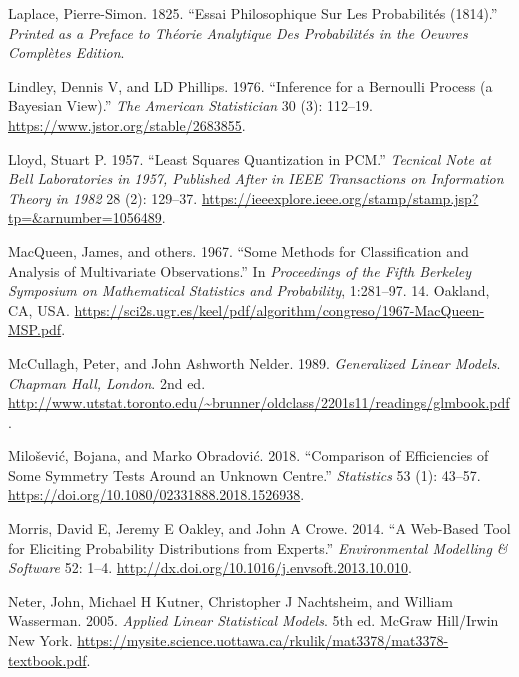 \documentclass[
]{book}
\newlength{\cslhangindent}
\newenvironment{cslreferences}%
  {\setlength{\parindent}{0pt}%
  \everypar{\setlength{\hangindent}{\cslhangindent}}\ignorespaces}%
  {\par}
\theoremstyle{definition}
\theoremstyle{definition}
\theoremstyle{definition}
\theoremstyle{remark}
\begin{document}
\begin{cslreferences}
\leavevmode\hypertarget{ref-laplace1825essai}{}%
Laplace, Pierre-Simon. 1825. ``Essai Philosophique Sur Les Probabilités (1814).'' \emph{Printed as a Preface to Théorie Analytique Des Probabilités in the Oeuvres Complètes Edition}.

\leavevmode\hypertarget{ref-lindley1976inference}{}%
Lindley, Dennis V, and LD Phillips. 1976. ``Inference for a Bernoulli Process (a Bayesian View).'' \emph{The American Statistician} 30 (3): 112--19. \url{https://www.jstor.org/stable/2683855}.

\leavevmode\hypertarget{ref-lloyd1982least}{}%
Lloyd, Stuart P. 1957. ``Least Squares Quantization in PCM.'' \emph{Tecnical Note at Bell Laboratories in 1957, Published After in IEEE Transactions on Information Theory in 1982} 28 (2): 129--37. \url{https://ieeexplore.ieee.org/stamp/stamp.jsp?tp=\&arnumber=1056489}.

\leavevmode\hypertarget{ref-macqueen1967some}{}%
MacQueen, James, and others. 1967. ``Some Methods for Classification and Analysis of Multivariate Observations.'' In \emph{Proceedings of the Fifth Berkeley Symposium on Mathematical Statistics and Probability}, 1:281--97. 14. Oakland, CA, USA. \url{https://sci2s.ugr.es/keel/pdf/algorithm/congreso/1967-MacQueen-MSP.pdf}.

\leavevmode\hypertarget{ref-mccullagh1989generalized}{}%
McCullagh, Peter, and John Ashworth Nelder. 1989. \emph{Generalized Linear Models}. \emph{Chapman Hall, London}. 2nd ed. \url{http://www.utstat.toronto.edu/~brunner/oldclass/2201s11/readings/glmbook.pdf}.

\leavevmode\hypertarget{ref-milosevic2018comparison}{}%
Milošević, Bojana, and Marko Obradović. 2018. ``Comparison of Efficiencies of Some Symmetry Tests Around an Unknown Centre.'' \emph{Statistics} 53 (1): 43--57. \url{https://doi.org/10.1080/02331888.2018.1526938}.

\leavevmode\hypertarget{ref-morris2014web}{}%
Morris, David E, Jeremy E Oakley, and John A Crowe. 2014. ``A Web-Based Tool for Eliciting Probability Distributions from Experts.'' \emph{Environmental Modelling \& Software} 52: 1--4. \url{http://dx.doi.org/10.1016/j.envsoft.2013.10.010}.

\leavevmode\hypertarget{ref-neter2005applied}{}%
Neter, John, Michael H Kutner, Christopher J Nachtsheim, and William Wasserman. 2005. \emph{Applied Linear Statistical Models}. 5th ed. McGraw Hill/Irwin New York. \url{https://mysite.science.uottawa.ca/rkulik/mat3378/mat3378-textbook.pdf}.


\end{cslreferences}
\end{document}
